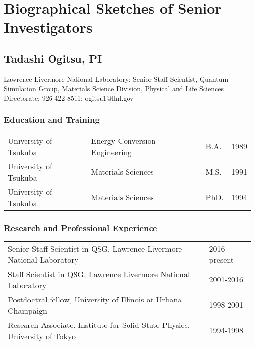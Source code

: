 
\section{Biographical Sketches of Senior Investigators}
\label{sec:bio}
\subsection*{Tadashi Ogitsu, PI}

Lawrence Livermore National Laboratory: Senior Staff Scientist, Quantum Simulation Group, Materials Science Division, Physical and Life Sciences Directorate; 926-422-8511; ogitsu1@llnl.gov

\subsubsection*{Education and Training}

\begin{table}[ht]
\centering
\begin{tabular}{llll} 
University of Tsukuba  & Energy Conversion Engineering & B.A. & 1989 \\ 
University of Tsukuba & Materials Sciences & M.S. & 1991 \\
University of Tsukuba & Materials Sciences & PhD. & 1994 \\
\end{tabular}
\end{table}

\subsubsection*{Research and Professional Experience}

\begin{table}[ht]
\centering
\begin{tabular}{ll} 
Senior Staff Scientist in QSG, Lawrence Livermore National Laboratory & 2016-present\\
Staff Scientist in QSG, Lawrence Livermore National Laboratory & 2001-2016 \\
Postdoctral fellow, University of Illinois at Urbana-Champaign & 1998-2001 \\
Research Associate, Institute for Solid State Physics, University of Tokyo & 1994-1998 \\
\end{tabular}
\end{table}

